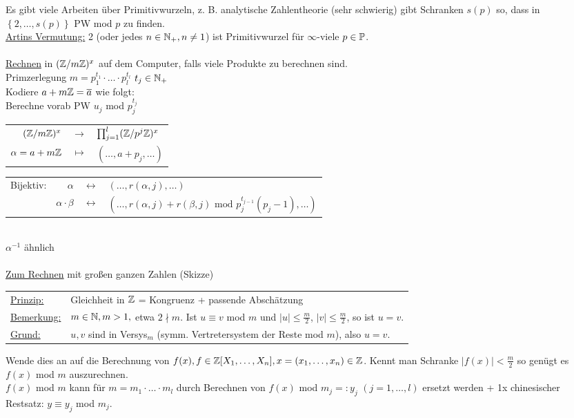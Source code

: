 \documentclass[a4paper,twoside,DIV15,BCOR12mm]{scrbook}
\begin{document}
Es gibt viele Arbeiten über Primitivwurzeln, z. B. analytische Zahlentheorie (sehr schwierig) gibt Schranken $s(p)$ so, dass in $\left\{2,\dotsc,s(p)\right\}$ PW mod $p$ zu finden. \\

\underline{Artins Vermutung:} 2 (oder jedes $n \in \mathbb{N}_+, n \neq 1$) ist Primitivwurzel für $\infty$-viele $p \in \mathbb{P}$. \\
\\
\underline{Rechnen} in $(\mathbb{Z}/m\mathbb{Z})^x$ auf dem Computer, falls viele Produkte zu berechnen sind. \\
Primzerlegung $m = p_1^{t_1}\cdot \dotsc \cdot p_l^{t_l}$ $t_j \in \mathbb{N}_+$ \\
Kodiere $a + m\mathbb{Z} = \overline a$ wie folgt: \\
Berechne vorab PW $u_j$ mod $p_j^{t_j}$ \\
\begin{tabular}{rcl}
$(\mathbb{Z}/m\mathbb{Z})^x$ & $\to$ & $\prod_{j=1}^l(\mathbb{Z}/p^j\mathbb{Z})^x$ \\
$\alpha=a+m\mathbb{Z}$ & $\mapsto$ & $(\dotsc,a+p_j,\dotsc)$
\end{tabular}

\begin{tabular}{lrcl}
Bijektiv: & $\alpha$ & $\leftrightarrow$ & $(\dotsc,r(\alpha,j),\dotsc)$ \\
 & $\alpha \cdot \beta$ & $\leftrightarrow$ & $(\dotsc,r(\alpha,j)+r(\beta,j) \mbox{ mod }p_j^{t_{j-1}}(p_j-1),\dotsc)$ 
\end{tabular} \\
$\alpha^{-1}$ ähnlich\\
\\
\underline{Zum Rechnen} mit großen ganzen Zahlen (Skizze) \\
\begin{tabular}{ll}
\underline{Prinzip:} & Gleichheit in $\mathbb{Z}$ = Kongruenz + passende Abschätzung \\
\underline{Bemerkung:} & $m \in \mathbb{N}, m > 1,$ etwa $2 \nmid m$. Ist $u \equiv v$ mod $m$ und $|u| \leq \frac{m}{2}$, $|v| \leq \frac{m}{2}$, so ist $u=v$. \\
\underline{Grund:} & $u, v$ sind in Versys$_m$ (symm. Vertretersystem der Reste mod $m$), also $u = v$.
\end{tabular}
Wende dies an auf die Berechnung von $f(x), f \in \mathbb{Z}[X_1,\dotsc,X_n], x = (x_1,\dotsc,x_n) \in \mathbb{Z}$. Kennt man Schranke $|f(x)| < \frac{m}{2}$ so genügt es $f(x)$ mod $m$ auszurechnen. \\
$f(x)$ mod $m$ kann für $m = m_1 \cdot \dotsc \cdot m_l$ durch Berechnen von $f(x)$ mod $m_j =: y_j$ $(j=1,\dotsc,l)$ ersetzt werden + 1x chinesischer Restsatz: $y \equiv y_j$ mod $m_j$. \\
\\
\end{document}
